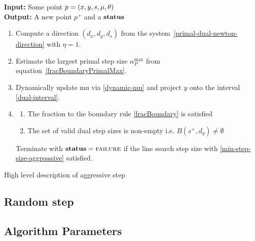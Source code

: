 \documentclass{article}
\begin{document}
\begin{algorithm}[H]
\textbf{Input:} Some point $p = (x, y, s, \mu, \theta)$ \\
\textbf{Output:} A new point $p^{+}$ and a $\textbf{status}$
\begin{enumerate}[label*=A.{\arabic*}]
\item Compute a direction $(d_{x}, d_{y}, d_{s})$ from the system~\eqref{primal-dual-newton-direction} with $\eta = 1$.
\item Estimate the largest primal step size $\alpha^{\max}_{P}$ from equation~\eqref{fracBoundaryPrimalMax}.
\item Dynamically update mu via \eqref{dynamic-mu} and project $y$ onto the interval \eqref{dual-interval}.
\item \label{agg:back-track} \backtrackBlurb
\begin{enumerate}[label=({\roman*})] 
\item The fraction to the boundary rule \eqref{fracBoundary} is satisfied
\item The set of valid dual step sizes is non-empty i.e. $B( s^{+}, d_{y} ) \neq \emptyset$ 
\end{enumerate}
Terminate with $\textbf{status} = \textsc{failure}$ if the line search step size with \eqref{min-step-size-aggresssive} satisfied.
\end{enumerate}
\caption{High level description of aggressive step}\label{alg:aggressive}
\end{algorithm}


\subsection{Random step}


\subsection{Algorithm Parameters}
\end{document}
